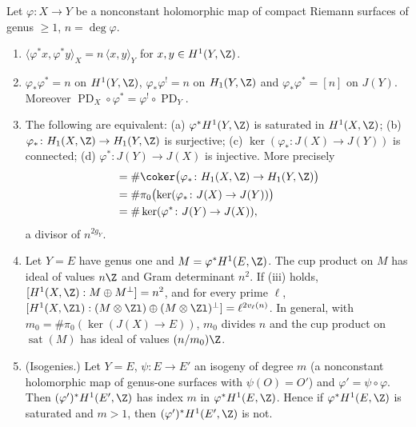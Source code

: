 \begin{proposition}\label{prop:curves:degree-cup-product}
Let $\varphi\colon X\to Y$ be a nonconstant holomorphic map of compact Riemann surfaces of genus $\ge1$, $n=\deg\varphi$.
\begin{enumerate}[label=(\roman*)]
\item $\langle\varphi^*x,\varphi^*y\rangle_X=n\,\langle x,y\rangle_Y$ for $x,y\in H^1(Y,\Z)$.
\item $\varphi_*\varphi^*=n$ on $H^1(Y,\Z)$, $\varphi_*\varphi^!=n$ on $H_1(Y,\Z)$ and $\varphi_*\varphi^*=[n]$ on $J(Y)$. Moreover $\operatorname{PD}_X\circ\varphi^*=\varphi^!\circ\operatorname{PD}_Y$.
\item The following are equivalent: (a) $\varphi^*H^1(Y,\Z)$ is saturated in $H^1(X,\Z)$; (b) $\varphi_*\colon H_1(X,\Z)\to H_1(Y,\Z)$ is surjective; (c) $\ker(\varphi_*\colon J(X)\to J(Y))$ is
connected; (d) $\varphi^*\colon J(Y)\to J(X)$ is injective. More precisely
\begin{align*}
[\operatorname{sat}(\varphi^*H^1(Y,\Z)):\varphi^*H^1(Y,\Z)]&=\#\coker\bigl(\varphi_*\colon H_1(X,\Z)\to H_1(Y,\Z)\bigr)\\
&=\#\pi_0\bigl(\ker(\varphi_*\colon J(X)\to J(Y))\bigr)\\
&=\#\ker(\varphi^*\colon J(Y)\to J(X)),
\end{align*}
a divisor of $n^{2g_Y}$.
\item Let $Y=E$ have genus one and $M=\varphi^*H^1(E,\Z)$. The cup product on $M$ has ideal of values $n\Z$ and Gram determinant $n^2$. If (iii) holds,
$[H^1(X,\Z):M\oplus M^\perp]=n^2$, and for every prime $\ell$, $[H^1(X,\Zl):(M\otimes\Zl)\oplus(M\otimes\Zl)^\perp]=\ell^{2v_\ell(n)}$. In general, with $m_0=\#\pi_0(\ker(J(X)\to E))$,
$m_0$ divides $n$ and the cup product on $\operatorname{sat}(M)$ has ideal of values $(n/m_0)\Z$.
\item (Isogenies.) Let $Y=E$, $\psi\colon E\to E'$ an isogeny of degree $m$ (a nonconstant holomorphic map of genus-one surfaces with $\psi(O)=O'$) and $\varphi'=\psi\circ\varphi$. Then
$(\varphi')^*H^1(E',\Z)$ has index $m$ in $\varphi^*H^1(E,\Z)$. Hence if $\varphi^*H^1(E,\Z)$ is saturated and $m>1$, then $(\varphi')^*H^1(E',\Z)$ is not.
\end{enumerate}
\end{proposition}

